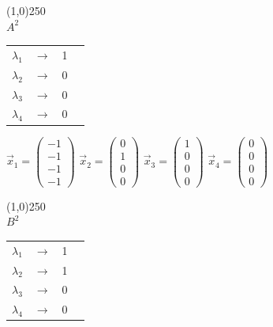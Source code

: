 \documentclass[12pt]{scrreprt}
\begin{document}
  \begin{center}
  \line(1,0){250}\\
  \textbf{$A^2$}
  \end{center}

  \begin{center}
  \begin{tabular}{ c c c p{5cm} }
    $\lambda_1$ & $\rightarrow$ & 1 \\        
    $\lambda_2$ & $\rightarrow$ & 0 \\
    $\lambda_3$ & $\rightarrow$ & 0 \\
    $\lambda_4$ & $\rightarrow$ & 0 \\
  \end{tabular}
  \end{center}

  \begin{center}
  $\vec{x}_1 = \begin{pmatrix}-1\\ -1 \\ -1 \\ -1 \end{pmatrix}$
  $\vec{x}_2 = \begin{pmatrix}0\\ 1 \\ 0 \\ 0 \end{pmatrix}$
  $\vec{x}_3 = \begin{pmatrix}1\\ 0 \\ 0 \\ 0 \end{pmatrix}$
  $\vec{x}_4 = \begin{pmatrix}0\\ 0 \\ 0 \\ 0 \end{pmatrix}$
  \end{center}

  \begin{center}
  \line(1,0){250}\\
  \textbf{$B^2$}
  \end{center}

  \begin{center}
  \begin{tabular}{ c c c p{5cm} }
    $\lambda_1$ & $\rightarrow$ & 1 \\        
    $\lambda_2$ & $\rightarrow$ & 1 \\
    $\lambda_3$ & $\rightarrow$ & 0 \\
    $\lambda_4$ & $\rightarrow$ & 0 \\
  \end{tabular}
  \end{center}
\end{document}
